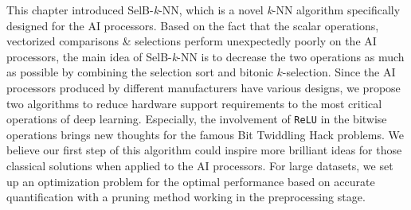 This chapter introduced SelB-\textit{k}-NN, which is a novel \textit{k}-NN algorithm specifically designed for the AI processors. Based on the fact that the scalar operations, vectorized comparisons \& selections perform unexpectedly poorly on the AI processors, the main idea of SelB-\textit{k}-NN is to decrease the two operations as much as possible by combining the selection sort and bitonic $k$-selection. Since the AI processors produced by different manufacturers have various designs, we propose two algorithms to reduce hardware support requirements to the most critical operations of deep learning. Especially, the involvement of \verb|ReLU| in the bitwise operations brings new thoughts for the famous Bit Twiddling Hack problems. We believe our first step of this algorithm could inspire more brilliant ideas for those classical solutions when applied to the AI processors. For large datasets, we set up an optimization problem for the optimal performance based on accurate quantification with a pruning method working in the preprocessing stage.